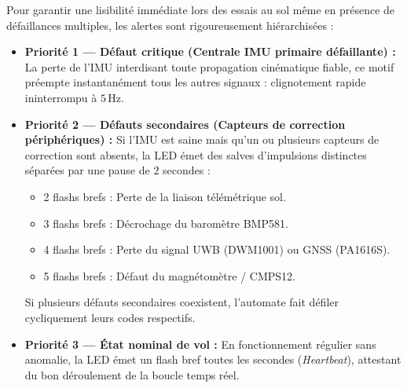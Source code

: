 \documentclass[../Implementation.tex]{subfiles}
\begin{document}
Pour garantir une lisibilité immédiate lors des essais au sol même en présence de défaillances multiples, les alertes sont rigoureusement hiérarchisées :
\begin{itemize}
    \item \textbf{Priorité 1 — Défaut critique (Centrale IMU primaire défaillante) :}
    La perte de l'IMU interdisant toute propagation cinématique fiable, ce motif préempte instantanément tous les autres signaux : clignotement rapide ininterrompu à $5\,\text{Hz}$.
    \item \textbf{Priorité 2 — Défauts secondaires (Capteurs de correction périphériques) :}
    Si l'IMU est saine mais qu'un ou plusieurs capteurs de correction sont absents, la LED émet des salves d'impulsions distinctes séparées par une pause de $2$ secondes :
    \begin{itemize}
        \item 2 flashs brefs : Perte de la liaison télémétrique sol.
        \item 3 flashs brefs : Décrochage du baromètre BMP581.
        \item 4 flashs brefs : Perte du signal UWB (DWM1001) ou GNSS (PA1616S).
        \item 5 flashs brefs : Défaut du magnétomètre / CMPS12.
    \end{itemize}
    Si plusieurs défauts secondaires coexistent, l'automate fait défiler cycliquement leurs codes respectifs.
    \item \textbf{Priorité 3 — État nominal de vol :}
    En fonctionnement régulier sans anomalie, la LED émet un flash bref toutes les secondes (\textit{Heartbeat}), attestant du bon déroulement de la boucle temps réel.
\end{itemize}
\end{document}
